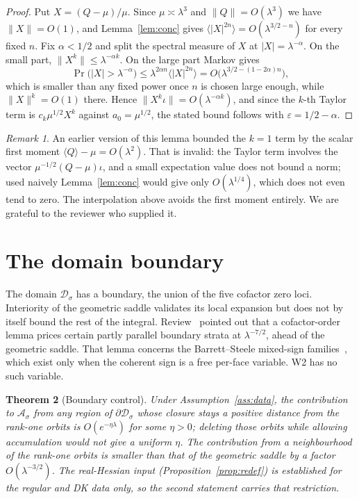 \documentclass[11pt]{article}
\numberwithin{equation}{section}
\newtheorem{theorem}{Theorem}[section]
\theoremstyle{definition}
\theoremstyle{remark}
\newtheorem{remark}[theorem]{Remark}
\newcommand{\Dom}{\mathcal D}
\begin{document}
\begin{proof}
Put $X=(Q-\mu)/\mu$. Since $\mu\asymp\lambda^3$ and $\|Q\|=O(\lambda^3)$ we have
$\|X\|=O(1)$, and Lemma~\ref{lem:conc} gives
$\langle|X|^{2n}\rangle=O(\lambda^{3/2-n})$ for every fixed $n$. Fix
$\alpha<1/2$ and split the spectral measure of $X$ at $|X|=\lambda^{-\alpha}$. On
the small part, $\|X^k\|\le\lambda^{-\alpha k}$. On the large part Markov gives
\[
\Pr\bigl(|X|>\lambda^{-\alpha}\bigr)
\le\lambda^{2\alpha n}\langle|X|^{2n}\rangle
=O\bigl(\lambda^{3/2-(1-2\alpha)n}\bigr),
\]
which is smaller than any fixed power once $n$ is chosen large enough, while
$\|X\|^k=O(1)$ there. Hence $\|X^k\iota\|=O(\lambda^{-\alpha k})$, and since the
$k$-th Taylor term is $c_k\mu^{1/2}X^k$ against $a_0=\mu^{1/2}$, the stated bound
follows with $\varepsilon=1/2-\alpha$.
\end{proof}

\begin{remark}
An earlier version of this lemma bounded the $k=1$ term by the scalar first
moment $\langle Q\rangle-\mu=O(\lambda^2)$. That is invalid: the Taylor term
involves the vector $\mu^{-1/2}(Q-\mu)\iota$, and a small expectation value does
not bound a norm; used naively Lemma~\ref{lem:conc} would give only
$O(\lambda^{1/4})$, which does not even tend to zero. The interpolation above
avoids the first moment entirely. We are grateful to the reviewer who supplied
it.
\end{remark}

\section{The domain boundary}\label{sec:boundary}

The domain $\Dom_\sigma$ has a boundary, the union of the five cofactor zero
loci. Interiority of the geometric saddle validates its local expansion but does
not by itself bound the rest of the integral. Review~\cite{PR355} pointed out that
a cofactor-order lemma prices certain partly parallel boundary strata at
$\lambda^{-7/2}$, ahead of the geometric saddle. That lemma concerns the
Barrett--Steele mixed-sign families~\cite{BarrettSteele2003}, which exist only
when the coherent sign is a free per-face variable. W2 has no such variable.

\begin{theorem}[Boundary control]\label{thm:boundary}
Under Assumption~\ref{ass:data}, the contribution to $\mathcal A_\sigma$ from any
region of $\partial\Dom_\sigma$ whose closure stays a positive distance from the
rank-one orbits is $O(e^{-\eta\lambda})$ for some $\eta>0$; deleting those orbits
while allowing accumulation would not give a uniform $\eta$. The contribution
from a neighbourhood of the rank-one orbits is smaller than that of the geometric
saddle by a factor $O(\lambda^{-3/2})$. The real-Hessian input
(Proposition~\ref{prop:redef}) is established for the regular and DK data only,
so the second statement carries that restriction.
\end{theorem}
\end{document}

